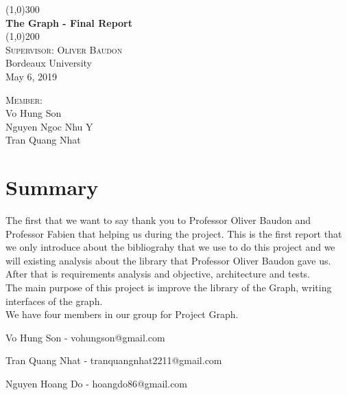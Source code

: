 \documentclass[a4paper,10pt]{article}
\begin{document}
\begin{titlepage} 
	\begin{center}
	\line(1,0){300}\\
	[0.25in]
	\huge{\bfseries The Graph - Final Report}\\
	[2mm]
	\line(1,0){200}\\
	[1cm]
	\textsc{\Large Supervisor: Oliver Baudon}\\
	\textmd{\Large Bordeaux University \\
	May 6, 2019}\\
	[13cm]
	\end{center}
	\begin{flushright}
	\textsc{Member: \\}
	Vo Hung Son \\
	Nguyen Ngoc Nhu Y \\
	Tran Quang Nhat \\
	\end{flushright}
\end{titlepage}
%

\section*{Summary}

The first that we want to say thank you to Professor Oliver Baudon and Professor Fabien that helping us during the project. This is the first report that we only introduce about the bibliograhy that we use to do this project and we will existing analysis about the library that Professor Oliver Baudon gave us. After that is requirements analysis and objective, architecture and tests. \\
The main purpose of this project is improve the library of the Graph, writing interfaces of the graph.\\
We have four members in our group for Project Graph.

Vo Hung Son - vohungson@gmail.com

Tran Quang Nhat - tranquangnhat2211@gmail.com

Nguyen Hoang Do - hoangdo86@gmail.com
\end{document}
